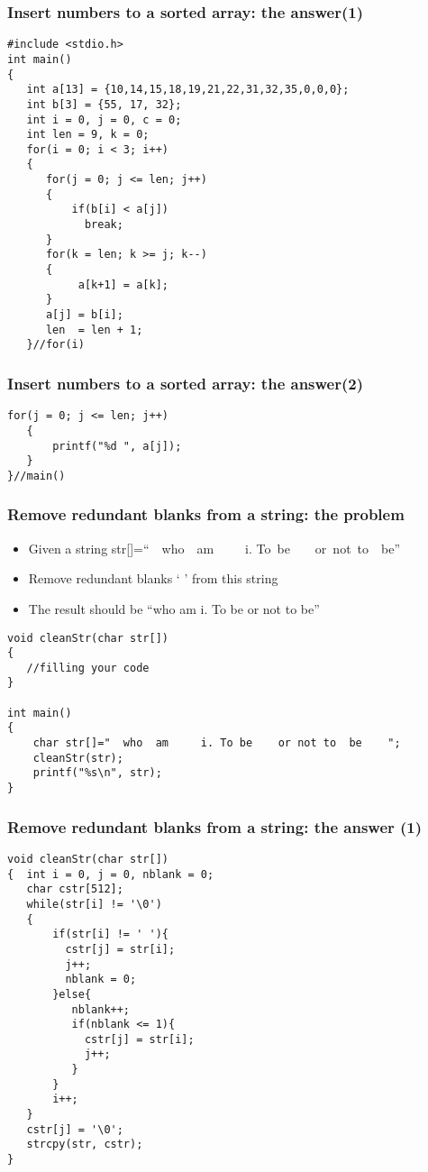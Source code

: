 \ifx\answer\undefined
\begin{frame}[fragile]
\frametitle{Insert numbers to a sorted array: the answer(1)}
\vspace{-0.2in}
\begin{lstlisting}[xleftmargin=0.04\linewidth, linewidth=0.96\linewidth]
#include <stdio.h>
int main()
{
   int a[13] = {10,14,15,18,19,21,22,31,32,35,0,0,0};
   int b[3] = {55, 17, 32};
   int i = 0, j = 0, c = 0;
   int len = 9, k = 0;
   for(i = 0; i < 3; i++)
   {
      for(j = 0; j <= len; j++)
      {
          if(b[i] < a[j])
            break;
      }
      for(k = len; k >= j; k--)
      {
           a[k+1] = a[k];
      }
      a[j] = b[i];
      len  = len + 1;
   }//for(i)
\end{lstlisting}
\end{frame}
\fi

\ifx\answer\undefined
\begin{frame}[fragile]
\frametitle{Insert numbers to a sorted array: the answer(2)}

\begin{lstlisting}[xleftmargin=0.05\linewidth, linewidth=0.9\linewidth,firstnumber=21]
   for(j = 0; j <= len; j++)
   {
       printf("%d ", a[j]);
   }
}//main()
\end{lstlisting}
\end{frame}
\fi


\begin{frame}[fragile]
\frametitle{Remove redundant blanks from a string: the problem}
\begin{itemize}
	\item {Given a string str[]=``~~who~~am~~~~~i. To~be~~~~or~not~to~~be''}
	\item {Remove redundant blanks ` ' from this string}
	\item {The result should be ``who am i. To be or not to be''}
\end{itemize}
\begin{lstlisting}
void cleanStr(char str[])
{
   //filling your code
}

int main()
{
    char str[]="  who  am     i. To be    or not to  be    ";
    cleanStr(str);
    printf("%s\n", str);
}
\end{lstlisting}
\end{frame}

\ifx\answer\undefined
\begin{frame}[fragile]
\frametitle{Remove redundant blanks from a string: the answer (1)}
\vspace{-0.15in}
\begin{lstlisting}
void cleanStr(char str[])
{  int i = 0, j = 0, nblank = 0;
   char cstr[512];
   while(str[i] != '\0')
   {
       if(str[i] != ' '){
         cstr[j] = str[i];
         j++;
         nblank = 0;
       }else{
          nblank++;
          if(nblank <= 1){
            cstr[j] = str[i];
            j++;
          }
       }
       i++;
   }
   cstr[j] = '\0';
   strcpy(str, cstr);
}
\end{lstlisting}
\end{frame}
\fi

